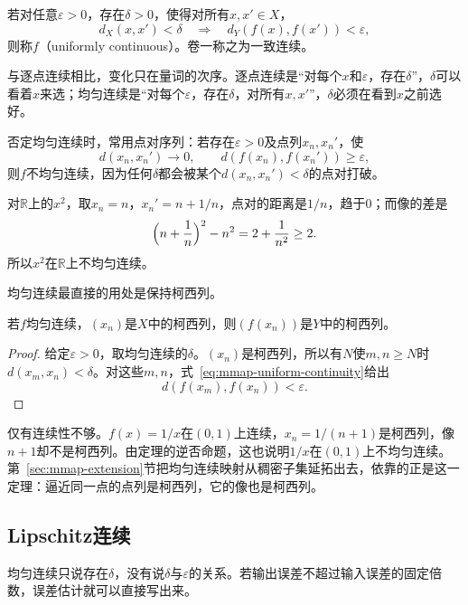 \begin{definition}[均匀连续]
\label{def:mmap-uniform-continuity}
若对任意$\varepsilon>0$，存在$\delta>0$，使得对所有$x,x'\in X$，
\begin{equation}
 d_X(x,x')<\delta
 \quad\Longrightarrow\quad
 d_Y(f(x),f(x'))<\varepsilon,
 \label{eq:mmap-uniform-continuity}
\end{equation}
则称$f$（uniformly continuous）。卷一称之为一致连续。
\end{definition}

与逐点连续相比，变化只在量词的次序。逐点连续是“对每个$x$和$\varepsilon$，存在$\delta$”，$\delta$可以看着$x$来选；均匀连续是“对每个$\varepsilon$，存在$\delta$，对所有$x,x'$”，$\delta$必须在看到$x$之前选好。

否定均匀连续时，常用点对序列：若存在$\varepsilon>0$及点列$x_n,x_n'$，使
\[
 d(x_n,x_n')\to0,\qquad d(f(x_n),f(x_n'))\geq\varepsilon,
\]
则$f$不均匀连续，因为任何$\delta$都会被某个$d(x_n,x_n')<\delta$的点对打破。

对$\mathbb R$上的$x^2$，取$x_n=n$，$x_n'=n+1/n$，点对的距离是$1/n$，趋于$0$；而像的差是
\[
 \Bigl(n+\frac1n\Bigr)^2-n^2=2+\frac1{n^2}\geq2.
\]
所以$x^2$在$\mathbb R$上不均匀连续。

均匀连续最直接的用处是保持柯西列。

\begin{theorem}[均匀连续映射保持柯西列]
\label{thm:mmap-uniform-cauchy-image}
若$f$均匀连续，$(x_n)$是$X$中的柯西列，则$(f(x_n))$是$Y$中的柯西列。
\end{theorem}

\begin{proof}
给定$\varepsilon>0$，取均匀连续的$\delta$。$(x_n)$是柯西列，所以有$N$使$m,n\geq N$时$d(x_m,x_n)<\delta$。对这些$m,n$，式~\eqref{eq:mmap-uniform-continuity}给出
\[
 d(f(x_m),f(x_n))<\varepsilon.
\]
\end{proof}

仅有连续性不够。$f(x)=1/x$在$(0,1)$上连续，$x_n=1/(n+1)$是柯西列，像$n+1$却不是柯西列。由定理的逆否命题，这也说明$1/x$在$(0,1)$上不均匀连续。第~\ref{sec:mmap-extension}节把均匀连续映射从稠密子集延拓出去，依靠的正是这一定理：逼近同一点的点列是柯西列，它的像也是柯西列。

\subsection{Lipschitz连续}
\label{sec:mmap-lipschitz}

均匀连续只说存在$\delta$，没有说$\delta$与$\varepsilon$的关系。若输出误差不超过输入误差的固定倍数，误差估计就可以直接写出来。

